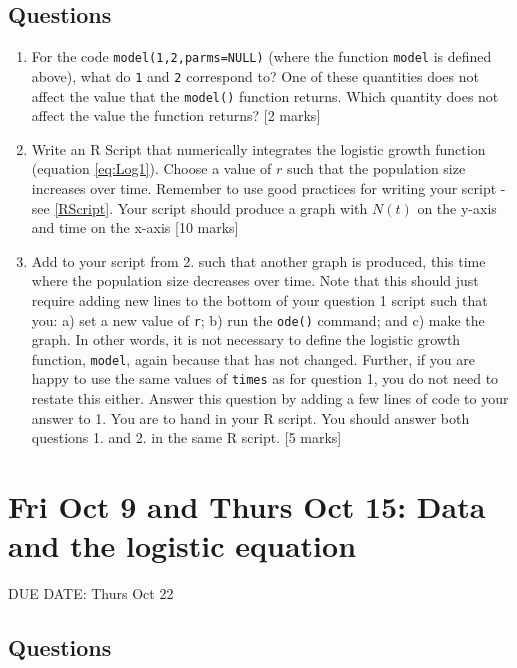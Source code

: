 \documentclass[]{book}
\begin{document}
\section{Questions}\label{questions-10}

\begin{enumerate}
\def\labelenumi{\arabic{enumi}.}
\item
  For the code \texttt{model(1,2,parms=NULL)} (where the function
  \texttt{model} is defined above), what do \texttt{1} and \texttt{2}
  correspond to? One of these quantities does not affect the value that
  the \texttt{model()} function returns. Which quantity does not affect
  the value the function returns? {[}2 marks{]}
\item
  Write an R Script that numerically integrates the logistic growth
  function (equation \eqref{eq:Log1}). Choose a value of \(r\) such that
  the population size increases over time. Remember to use good
  practices for writing your script - see \ref{RScript}. Your script
  should produce a graph with \(N(t)\) on the y-axis and time on the
  x-axis {[}10 marks{]}
\item
  Add to your script from 2. such that another graph is produced, this
  time where the population size decreases over time. Note that this
  should just require adding new lines to the bottom of your question 1
  script such that you: a) set a new value of \texttt{r}; b) run the
  \texttt{ode()} command; and c) make the graph. In other words, it is
  not necessary to define the logistic growth function, \texttt{model},
  again because that has not changed. Further, if you are happy to use
  the same values of \texttt{times} as for question 1, you do not need
  to restate this either. Answer this question by adding a few lines of
  code to your answer to 1. You are to hand in your R script. You should
  answer both questions 1. and 2. in the same R script. {[}5 marks{]}
\end{enumerate}

\chapter{Fri Oct 9 and Thurs Oct 15: Data and the logistic
equation}\label{fri-oct-9-and-thurs-oct-15-data-and-the-logistic-equation}

DUE DATE: Thurs Oct 22

\section{Questions}\label{questions-11}
\end{document}
